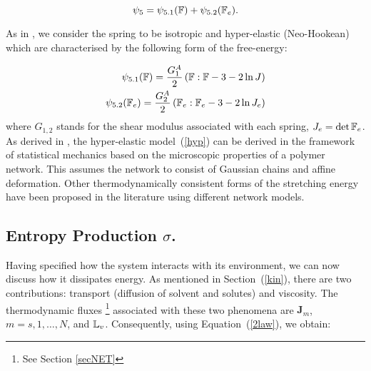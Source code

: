 \begin{equation}
\psi_5 = \psi_{5.1}(\mathbb{F}) + \psi_{5.2}(\mathbb{F}_e).
\end{equation}

As in \cite{ecm2}, we consider the spring to be isotropic and hyper-elastic (Neo-Hookean) which are characterised by the following form of the free-energy:

\begin{eqnarray}
\psi_{5.1}(\mathbb{F}) = \frac{G^A_1}{2} \left(\mathbb{F}:\mathbb{F} - 3 -2 \ln J\right)\\
\psi_{5.2}(\mathbb{F}_e) = \frac{G^A_2}{2} \left(\mathbb{F}_e:\mathbb{F}_e - 3 -2 \ln J_{e}\right)\label{hyp}
\end{eqnarray}
where $G_{1,2}$ stands for the shear modulus associated with each spring, $J_e= \det \mathbb{F}_e$. As derived in \cite{floryprinciples}, the hyper-elastic model~(\ref{hyp}) can be derived in the framework of statistical mechanics based on the microscopic properties of a polymer network. This assumes the network to consist of Gaussian chains and affine deformation. Other thermodynamically consistent forms of the stretching energy have been proposed in the literature \cite{BERGSTROM1998931,boyce2,doi} using different network models.

\subsection{Entropy Production $\sigma$.}
\label{ent}

Having specified how the system interacts with its environment, we can now discuss how it dissipates energy. As mentioned in Section~(\ref{kin}), there are two contributions: transport (diffusion of solvent and solutes) and viscosity. The thermodynamic fluxes \footnote{See Section \ref{secNET}} associated with these two phenomena are $\mathbf{J}_m$, $m=s,1,\ldots,N$, and $\mathbb{L}_v$. Consequently, using Equation~(\ref{2law}), we obtain:

